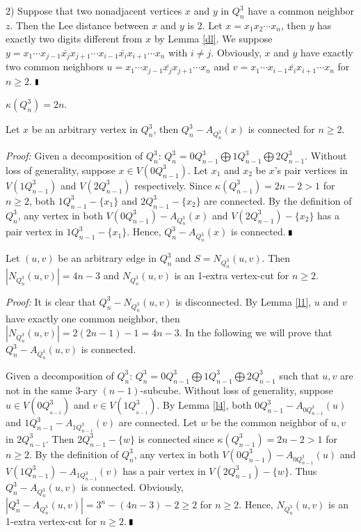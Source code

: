 \documentclass[preprint,number,12pt]{elsarticle}
\begin{document}
2) Suppose that two nonadjacent vertices $x$ and $y$ in $Q_{n}^{3}$ have a common neighbor $z$. Then the Lee distance between $x$ and $y$ is 2.  Let $x = x_{1}x_{2} \cdots x_{n}$, then $y $ has exactly two digits different from $x$ by Lemma \ref{dl}. We suppose  $y= x_{1} \cdots x_{j-1} \bar{x_{j}}x_{j+1} \cdots x_{i-1} \bar{x_{i}}x_{i+1}  \cdots x_{n}$ with $i \neq j$. Obviously, $x$ and $y$ have exactly two common neighbors $u = x_{1} \cdots x_{j-1} \bar{x_{j}}x_{j+1} \cdots x_{n}$ and $v = x_{1} \cdots x_{i-1} \bar{x_{i}}x_{i+1} \cdots x_{n}$ for $n \geq 2$. $\hfill\rule{1mm}{2mm}$



\begin{lem}\label{l3} \cite{Bose1995-p1021-1030}
$\kappa(Q_{n}^{3}) = 2n$.
\end{lem}

\begin{lem}\label{l4}
Let $x$ be an arbitrary vertex in $Q_{n}^{3}$, then $Q_{n}^{3}-A_{Q_{n}^{3}}(x)$ is connected for $n \geq 2$.
\end{lem}
\emph{Proof:}
Given a decomposition of $Q_n^3$: $Q_n^3=0Q_{n-1}^{3}\bigoplus 1Q_{n-1}^{3}\bigoplus 2Q_{n-1}^{3}$. Without loss of generality, suppose $x \in V(0Q_{n-1}^{3})$.  Let $x_1$ and $x_2$ be $x$'s pair vertices in  $V(1Q_{n-1}^{3})$ and $V(2Q_{n-1}^{3})$ respectively. Since $\kappa(Q_{n-1}^{3}) = 2n-2>1$ for $n\ge 2$, both $1Q_{n-1}^{3} - \{ x_1 \}$  and $2Q_{n-1}^{3} - \{ x_2 \}$ are connected.
By the definition of $Q_n^3$,
any vertex in both $V(0Q_{n-1}^{3})-A_{Q_{n}^{3}}(x)$ and $V(2Q_{n-1}^{3}) - \{ x_2 \}$ has a pair vertex in $1Q_{n-1}^{3} - \{ x_1 \}$.
Hence, $Q_{n}^{3}-A_{Q_{n}^{3}}(x)$ is connected. $\hfill\rule{1mm}{2mm}$

\begin{lem}\label{l5}
Let $(u, v)$ be an arbitrary edge in $Q_{n}^{3}$ and $S = N_{Q_{n}^{3}}(u, v)$. Then $|N_{Q_{n}^{3}}(u, v)| = 4n-3$ and $N_{Q_{n}^{3}}(u, v)$ is an 1-extra vertex-cut for $n \geq 2$.
\end{lem}
\emph{Proof:}
It is clear that $Q_{n}^{3}-N_{Q_{n}^{3}}(u, v)$ is disconnected. By Lemma \ref{l1}, $u$ and $v$ have exactly one common neighbor, then $|N_{Q_{n}^{3}}(u, v)| = 2(2n-1)-1 = 4n-3$.
In the following we will prove that $Q_{n}^{3}-A_{Q_{n}^{3}}(u, v)$ is connected.

Given a decomposition of $Q_n^3$: $Q_n^3=0Q_{n-1}^{3}\bigoplus 1Q_{n-1}^{3}\bigoplus 2Q_{n-1}^{3}$ such that
$u,v$ are not in the same 3-ary $(n-1)$-subcube. Without loss of generality, suppose
$u \in V(0Q_{_{n-1}}^{3})$ and $v \in V(1Q_{_{n-1}}^{3})$.
By Lemma \ref{l4}, both $0Q_{n-1}^{3}-A_{0Q_{n-1}^{3}}(u)$ and $1Q_{n-1}^{3}-A_{1Q_{n-1}^{3}}(v)$ are connected. Let
$w$ be the common neighbor of $u, v$ in $2Q_{n-1}^{3}$.
Then $2Q_{n-1}^{3}-\{w\}$ is connected since $\kappa(Q_{n-1}^{3}) = 2n-2>1$ for $n\ge 2$.
By the definition of $Q_n^3$,
any vertex in both $V(0Q_{n-1}^{3})-A_{0Q_{n-1}^{3}}(u)$ and $V(1Q_{n-1}^{3})-A_{1Q_{n-1}^{3}}(v)$
has a pair vertex in $V(2Q_{n-1}^{3}) - \{w\}$. Thus $Q_{n}^{3}-A_{Q_{n}^{3}}(u, v)$ is connected.
Obviously, $|Q_{n}^{3}-A_{Q_{n}^{3}}(u, v)|=3^n-(4n-3)-2\ge 2$ for $n\ge 2$.
Hence, $N_{Q_{n}^{3}}(u, v)$ is an 1-extra vertex-cut for $n \geq 2$. $\hfill\rule{1mm}{2mm}$
\end{document}
